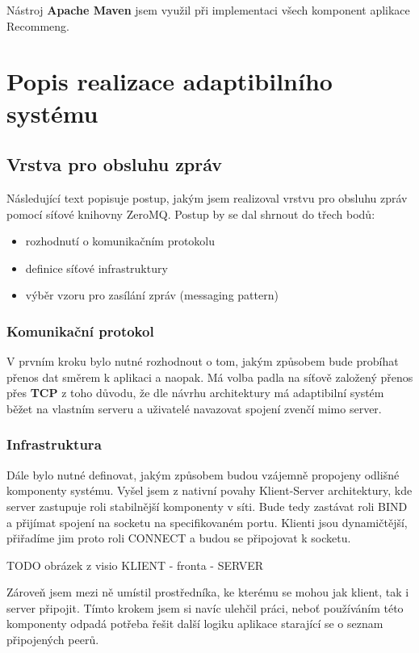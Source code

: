 \documentclass[thesis=M,czech]{FITthesis}[2014/05/07]
\begin{document}
Nástroj \textbf{Apache Maven} jsem využil při implementaci všech komponent aplikace Recommeng.

\section{Popis realizace adaptibilního systému}
\label{sec:impl}

\subsection{Vrstva pro obsluhu zpráv}
Následující text popisuje postup, jakým jsem realizoval vrstvu pro obsluhu zpráv pomocí síťové knihovny ZeroMQ. Postup by se dal shrnout do třech bodů:

\begin{itemize}
	\item rozhodnutí o komunikačním protokolu
	\item definice síťové infrastruktury
	\item výběr vzoru pro zasílání zpráv (messaging pattern)
\end{itemize}

\subsubsection{Komunikační protokol}
V prvním kroku bylo nutné rozhodnout o tom, jakým způsobem bude probíhat přenos dat směrem k aplikaci a naopak. Má volba padla na síťově založený přenos přes \textbf{TCP} z toho důvodu, že dle návrhu architektury má adaptibilní systém běžet na vlastním serveru a uživatelé navazovat spojení zvenčí mimo server. 

\subsubsection{Infrastruktura}
Dále bylo nutné definovat, jakým způsobem budou vzájemně propojeny odlišné komponenty systému. Vyšel jsem z nativní povahy Klient-Server architektury, kde server zastupuje roli stabilnější komponenty v síti. Bude tedy zastávat roli BIND a přijímat spojení na socketu na specifikovaném portu. Klienti jsou dynamičtější, přiřadíme jim proto roli CONNECT a budou se připojovat k socketu.

TODO obrázek z visio KLIENT - fronta - SERVER

Zároveň jsem mezi ně umístil prostředníka, ke kterému se mohou jak klient, tak i server připojit. Tímto krokem jsem si navíc ulehčil práci, neboť používáním této komponenty odpadá potřeba řešit další logiku aplikace starající se o seznam připojených peerů. 
\end{document}
